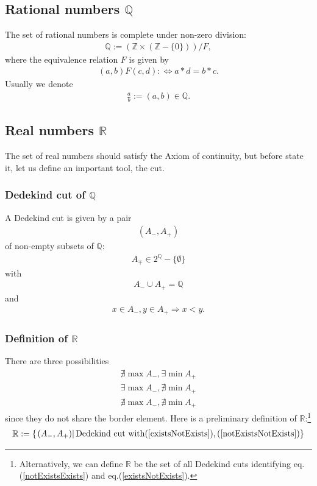 \documentclass[11pt]{book}
\begin{document}
\subsection{Rational numbers $\mathbb{Q}$}
The set of rational numbers is complete under non-zero division:
\begin{eqnarray}
\mathbb{Q} := \left(\mathbb{Z} \times (\mathbb{Z} - \{0\}) \right)/F,
\end{eqnarray}
where the equivalence relation $F$ is given by
\begin{eqnarray}
(a,b) F (c, d) : \Leftrightarrow a * d = b * c.
\end{eqnarray}
Usually we denote
\begin{eqnarray}
\frac{a}{b} := (a,b) \in \mathbb{Q}.
\end{eqnarray}

\subsection{Real numbers $\mathbb{R}$}
The set of real numbers should satisfy the Axiom of continuity, but before state it, let us define an important tool, the cut.

\subsubsection{Dedekind cut of $\mathbb{Q}$}
A Dedekind cut is given by a pair
\begin{eqnarray}
(A_-, A_+)
\end{eqnarray}
of non-empty subsets of $\mathbb{Q}$:
\begin{eqnarray}
A_\mp \in 2^\mathbb{Q}-\{\emptyset\}
\end{eqnarray}
with
\begin{eqnarray}
A_- \cup A_+ = \mathbb{Q}
\end{eqnarray}
and
\begin{eqnarray}
x \in A_-, y \in A_+ \Rightarrow x < y.
\end{eqnarray}

\subsubsection{Definition of $\mathbb{R}$}
There are three possibilities
\begin{eqnarray}
\label{notExistsExists}
\nexists \max A_-, \exists \min A_+ \\
\label{existsNotExists}
\exists \max A_-, \nexists \min A_+ \\
\label{notExistsNotExists}
\nexists \max A_-,  \nexists \min A_+ 
\end{eqnarray}
since they do not share the border element.
Here is a preliminary definition of $\mathbb{R}$:\footnote{
Alternatively, we can define $\mathbb{R}$ be the set of all Dedekind cuts identifying eq.(\ref{notExistsExists}) and eq.(\ref{existsNotExists}).
}
\begin{eqnarray}
\label{preReal}
\mathbb{R} := \left\{\left. (A_-, A_+) \right| \text{Dedekind cut with} (\ref{existsNotExists}), (\ref{notExistsNotExists})\right\}
\end{eqnarray}
\end{document}

